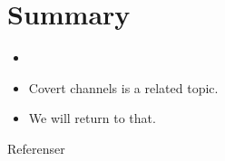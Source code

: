 \section{Summary}

\begin{frame}
  \begin{itemize}
    \item
  \end{itemize}

  \begin{remark}
    \begin{itemize}
      \item Covert channels is a related topic.
      \item We will return to that.
    \end{itemize}
  \end{remark}
\end{frame}




\begin{frame}{Referenser}
  \small
  \printbibliography{}
\end{frame}

